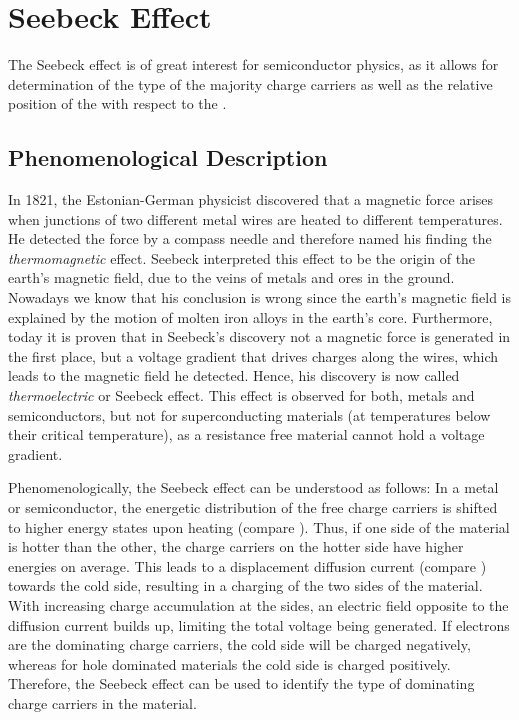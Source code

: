 \newpage
\section{Seebeck Effect}
The Seebeck effect is of great interest for semiconductor physics, as it allows for determination of the type of the majority charge carriers as well as the relative position of the \EfLong with respect to the \EtLong.

%
\subsection{Phenomenological Description}%
\label{sec:TheoSeePhenomenological}
In 1821, the Estonian-German physicist  discovered\cite{Seebeck1823} that a magnetic force arises when junctions of two different metal wires are heated to different temperatures. He detected the force by a compass needle and therefore named his finding the \emph{thermomagnetic} effect.
Seebeck interpreted this effect to be the origin of the earth's magnetic field, due to the veins of metals and ores in the ground\cite{Seebeck1823}.
Nowadays we know that his conclusion is wrong since the earth's magnetic field is explained by the motion of molten iron alloys in the earth's core. Furthermore, today it is proven that in Seebeck's discovery not a magnetic force is generated in the first place, but a voltage gradient that drives charges along the wires, which leads to the magnetic field he detected. Hence, his discovery is now called \emph{thermoelectric} or Seebeck effect.
This effect is observed for both, metals and semiconductors, but not for superconducting materials (at temperatures below their critical temperature), as a resistance free material cannot hold a voltage gradient.

Phenomenologically, the Seebeck effect can be understood as follows: In a metal or semiconductor, the energetic distribution of the free charge carriers is shifted to higher energy states upon heating (compare ). Thus, if one side of the material is hotter than the other, the charge carriers on the hotter side have higher energies on average.
This leads to a displacement diffusion current (compare ) towards the cold side, resulting in a charging of the two sides of the material. With increasing charge accumulation at the sides, an electric field opposite to the diffusion current builds up, limiting the total voltage being generated.
If electrons are the dominating charge carriers, the cold side will be charged negatively, whereas for hole dominated materials the cold side is charged positively. Therefore, the Seebeck effect can be used to identify the type of dominating charge carriers in the material.

